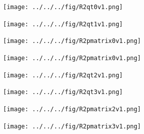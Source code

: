 \documentclass[dvipdfmx, fleqn, uplatex, a4paper]{jsarticle}
\begin{document}
\begin{figure}[H]
 \begin{minipage}{0.5\hsize}
  \begin{center}
   \texttt{[image: ../../../fig/R2qt0v1.png]}
  \end{center}
 \end{minipage}
 \begin{minipage}{0.5\hsize}
  \begin{center}
   \texttt{[image: ../../../fig/R2qt1v1.png]}
  \end{center}
 \end{minipage}
\end{figure}

\vspace{-1cm}

\begin{figure}[H]
 \begin{minipage}{0.5\hsize}
  \begin{center}
   \texttt{[image: ../../../fig/R2pmatrix0v1.png]}
  \end{center}
 \end{minipage}
 \begin{minipage}{0.5\hsize}
  \begin{center}
   \texttt{[image: ../../../fig/R2pmatrix0v1.png]}
  \end{center}
 \end{minipage}
\end{figure}

\begin{figure}[H]
 \begin{minipage}{0.5\hsize}
  \begin{center}
   \texttt{[image: ../../../fig/R2qt2v1.png]}
  \end{center}
 \end{minipage}
 \begin{minipage}{0.5\hsize}
  \begin{center}
   \texttt{[image: ../../../fig/R2qt3v1.png]}
  \end{center}
 \end{minipage}
\end{figure}

\vspace{-1cm}

\begin{figure}[H]
 \begin{minipage}{0.5\hsize}
  \begin{center}
   \texttt{[image: ../../../fig/R2pmatrix2v1.png]}
  \end{center}
 \end{minipage}
 \begin{minipage}{0.5\hsize}
  \begin{center}
   \texttt{[image: ../../../fig/R2pmatrix3v1.png]}
  \end{center}
 \end{minipage}
\end{figure}
\end{document}
